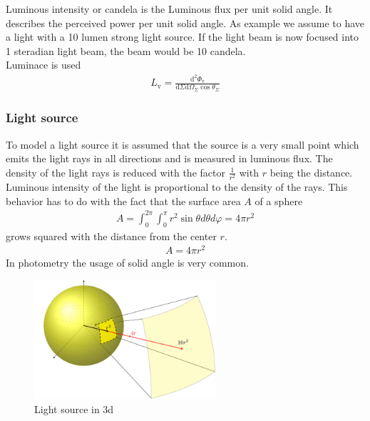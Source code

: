 Luminous intensity or candela is the Luminous flux per unit solid angle. It describes the perceived power per unit solid angle. As example we assume to have a light with a 10 lumen strong light source. If the light beam is now focused into 1 steradian light beam, the beam would be 10 candela.\\
Luminace is used 
\begin{align*}
L_{\mathrm{v}}=\frac{\mathrm{d}^{2} \Phi_{\mathrm{v}}}{\mathrm{d} \Sigma \mathrm{d} \Omega_{\Sigma} \cos \theta_{\Sigma}}
\end{align*}


\subsubsection{Light source}
To model a light source it is assumed that the source is a very small point which emits the light rays in all directions and is measured in luminous flux. The density of the light rays is reduced with the factor $\frac{1}{r^2}$ with $r$ being the distance. Luminous intensity of the light is proportional to the density of the rays. This behavior has to do with the fact that the surface area $A$ of a sphere
\begin{align*}
A=\int_{0}^{2 \pi} \int_{0}^{\pi} r^{2} \sin \theta d \theta d \varphi=4 \pi r^{2}
\end{align*}
grows squared with the distance from the center $r$.
\begin{align*}
A = 4\pi r^2
\end{align*}
In photometry the usage of solid angle is very common.  
\begin{figure}[ht]
	\centering
	\includegraphics[width=0.6\textwidth]{2-theory/backlight/light.pdf}
	\caption{Light source in 3d\label{theory:light}}
\end{figure} 
\\

